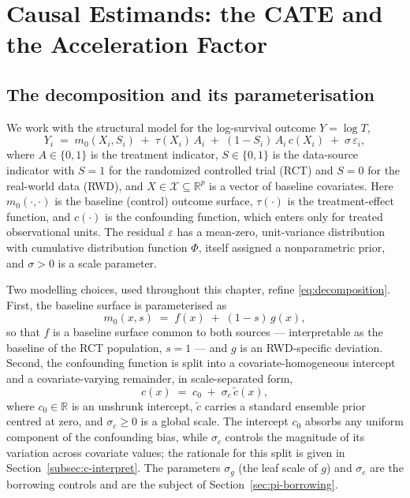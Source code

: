 \documentclass[11pt]{report}
\theoremstyle{plain}
\theoremstyle{definition}
\theoremstyle{remark}
\newcommand{\1}{\mathds{1}}
\theoremstyle{plain}
\theoremstyle{remark}
\newcommand{\X}{\mathcal{X}}
\begin{document}
\section{Causal Estimands: the CATE and the Acceleration Factor}
\label{sec:pi-estimands}

\subsection{The decomposition and its parameterisation}

We work with the structural model for the log-survival outcome
$Y = \log T$,
\begin{equation}
\label{eq:decomposition}
Y_i \;=\; m_0(X_i, S_i) \;+\; \tau(X_i)\,A_i \;+\; (1 - S_i)\,A_i\, c(X_i)
        \;+\; \sigma\,\varepsilon_i ,
\end{equation}
where $A \in \{0,1\}$ is the treatment indicator, $S \in \{0,1\}$ is the
data-source indicator with $S = 1$ for the randomized controlled trial (RCT)
and $S = 0$ for the real-world data (RWD), and $X \in \X \subseteq
\mathbb{R}^p$ is a vector of baseline covariates. Here $m_0(\cdot,\cdot)$ is the
baseline (control) outcome surface, $\tau(\cdot)$ is the treatment-effect
function, and $c(\cdot)$ is the confounding function, which enters only for
treated observational units. The residual $\varepsilon$ has a mean-zero,
unit-variance distribution with cumulative distribution function $\Phi$, itself
assigned a nonparametric prior, and $\sigma > 0$ is a scale parameter.

Two modelling choices, used throughout this chapter, refine
\eqref{eq:decomposition}. First, the baseline surface is parameterised as
\begin{equation}
\label{eq:m0-split}
m_0(x, s) \;=\; f(x) \;+\; (1 - s)\, g(x),
\end{equation}
so that $f$ is a baseline surface common to both sources --- interpretable as
the baseline of the RCT population, $s = 1$ --- and $g$ is an RWD-specific
deviation. Second, the confounding function is split into a
covariate-homogeneous intercept and a covariate-varying remainder, in
scale-separated form,
\begin{equation}
\label{eq:c-scale}
c(x) \;=\; c_0 \;+\; \sigma_c\,\tilde c(x),
\end{equation}
where $c_0 \in \mathbb{R}$ is an unshrunk intercept, $\tilde c$ carries a
standard ensemble prior centred at zero, and $\sigma_c \ge 0$ is a global scale.
The intercept $c_0$ absorbs any uniform component of the confounding bias, while
$\sigma_c$ controls the magnitude of its variation across covariate values; the
rationale for this split is given in Section~\ref{subsec:c-interpret}. The
parameters $\sigma_g$ (the leaf scale of $g$) and $\sigma_c$ are the borrowing
controls and are the subject of Section~\ref{sec:pi-borrowing}.
\end{document}
